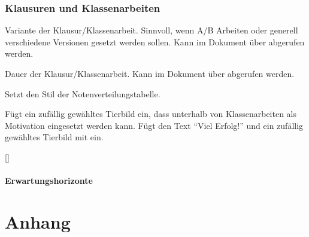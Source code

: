 \documentclass[a4paper,add-index,ngerman]{cnltx-doc}
\begin{document}
\section{Klausuren und Klassenarbeiten}
\begin{options}
	Variante der Klausur/Klassenarbeit. Sinnvoll, wenn A/B Arbeiten oder generell verschiedene Versionen gesetzt werden sollen. Kann im Dokument über  abgerufen werden.

	Dauer der Klausur/Klassenarbeit. Kann im Dokument über  abgerufen werden.
	
	Setzt den Stil der Notenverteilungstabelle.
\end{options}
\begin{commands}
	Fügt ein zufällig gewähltes Tierbild ein, dass unterhalb von Klassenarbeiten als Motivation eingesetzt werden kann.
	Fügt den Text \enquote{Viel Erfolg!} und ein zufällig gewähltes Tierbild mit  ein.
	
	[]
\end{commands}


\subsection{Erwartungshorizonte}



\part{Anhang}
\end{document}
